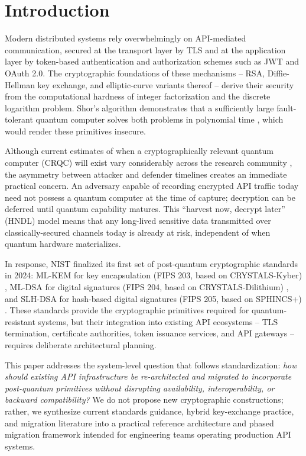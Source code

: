 \documentclass[conference]{IEEEtran}
\begin{document}
\section{Introduction}

Modern distributed systems rely overwhelmingly on API-mediated
communication, secured at the transport layer by TLS and at the application
layer by token-based authentication and authorization schemes such as JWT
and OAuth 2.0. The cryptographic foundations of these mechanisms --
RSA, Diffie-Hellman key exchange, and elliptic-curve variants thereof --
derive their security from the computational hardness of integer
factorization and the discrete logarithm problem. Shor's algorithm
demonstrates that a sufficiently large fault-tolerant quantum computer
solves both problems in polynomial time \cite{shor1997}, which would render
these primitives insecure.

Although current estimates of when a cryptographically relevant quantum
computer (CRQC) will exist vary considerably across the research community
\cite{mosca_estimate}, the asymmetry between attacker and defender timelines
creates an immediate practical concern. An adversary capable of recording
encrypted API traffic today need not possess a quantum computer at the time
of capture; decryption can be deferred until quantum capability matures.
This ``harvest now, decrypt later'' (HNDL) model means that any
long-lived sensitive data transmitted over classically-secured channels
today is already at risk, independent of when quantum hardware
materializes.

In response, NIST finalized its first set of post-quantum cryptographic
standards in 2024: ML-KEM for key encapsulation (FIPS 203, based on
CRYSTALS-Kyber) \cite{nist_fips203,kyber}, ML-DSA for digital signatures
(FIPS 204, based on CRYSTALS-Dilithium) \cite{nist_fips204,dilithium}, and
SLH-DSA for hash-based digital signatures (FIPS 205, based on SPHINCS+)
\cite{nist_fips205,sphincs}. These standards provide the cryptographic
primitives required for quantum-resistant systems, but their integration
into existing API ecosystems -- TLS termination, certificate authorities,
token issuance services, and API gateways -- requires deliberate
architectural planning.

This paper addresses the system-level question that follows standardization:
\emph{how should existing API infrastructure be re-architected and migrated
to incorporate post-quantum primitives without disrupting availability,
interoperability, or backward compatibility?} We do not propose new
cryptographic constructions; rather, we synthesize current standards
guidance, hybrid key-exchange practice, and migration literature into a
practical reference architecture and phased migration framework intended
for engineering teams operating production API systems.
\end{document}
